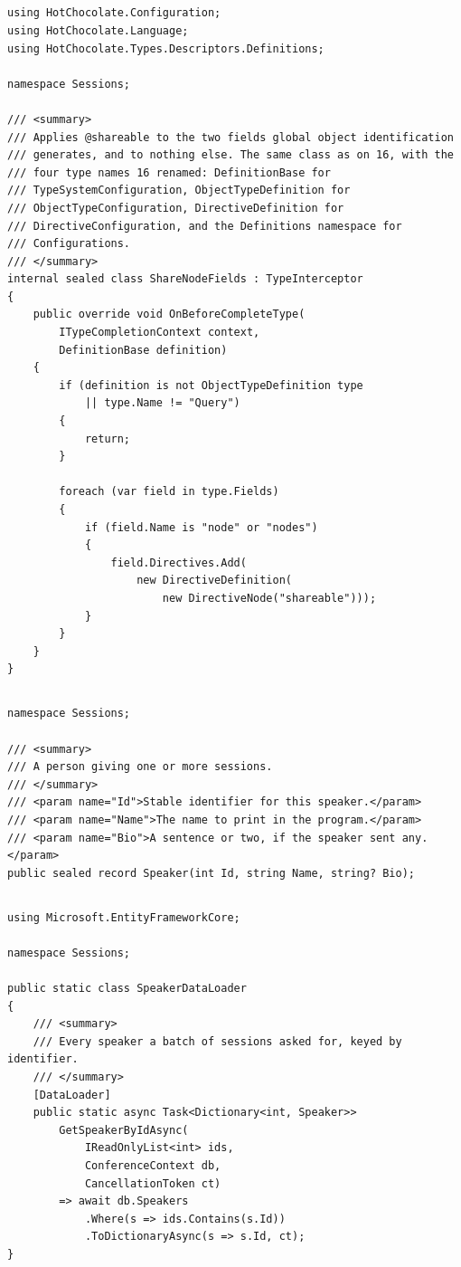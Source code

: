 \subsection*{}
\begin{verbatim}
using HotChocolate.Configuration;
using HotChocolate.Language;
using HotChocolate.Types.Descriptors.Definitions;

namespace Sessions;

/// <summary>
/// Applies @shareable to the two fields global object identification
/// generates, and to nothing else. The same class as on 16, with the
/// four type names 16 renamed: DefinitionBase for
/// TypeSystemConfiguration, ObjectTypeDefinition for
/// ObjectTypeConfiguration, DirectiveDefinition for
/// DirectiveConfiguration, and the Definitions namespace for
/// Configurations.
/// </summary>
internal sealed class ShareNodeFields : TypeInterceptor
{
    public override void OnBeforeCompleteType(
        ITypeCompletionContext context,
        DefinitionBase definition)
    {
        if (definition is not ObjectTypeDefinition type
            || type.Name != "Query")
        {
            return;
        }

        foreach (var field in type.Fields)
        {
            if (field.Name is "node" or "nodes")
            {
                field.Directives.Add(
                    new DirectiveDefinition(
                        new DirectiveNode("shareable")));
            }
        }
    }
}
\end{verbatim}

\subsection*{}
\begin{verbatim}
namespace Sessions;

/// <summary>
/// A person giving one or more sessions.
/// </summary>
/// <param name="Id">Stable identifier for this speaker.</param>
/// <param name="Name">The name to print in the program.</param>
/// <param name="Bio">A sentence or two, if the speaker sent any.</param>
public sealed record Speaker(int Id, string Name, string? Bio);
\end{verbatim}

\subsection*{}
\begin{verbatim}
using Microsoft.EntityFrameworkCore;

namespace Sessions;

public static class SpeakerDataLoader
{
    /// <summary>
    /// Every speaker a batch of sessions asked for, keyed by identifier.
    /// </summary>
    [DataLoader]
    public static async Task<Dictionary<int, Speaker>>
        GetSpeakerByIdAsync(
            IReadOnlyList<int> ids,
            ConferenceContext db,
            CancellationToken ct)
        => await db.Speakers
            .Where(s => ids.Contains(s.Id))
            .ToDictionaryAsync(s => s.Id, ct);
}
\end{verbatim}

